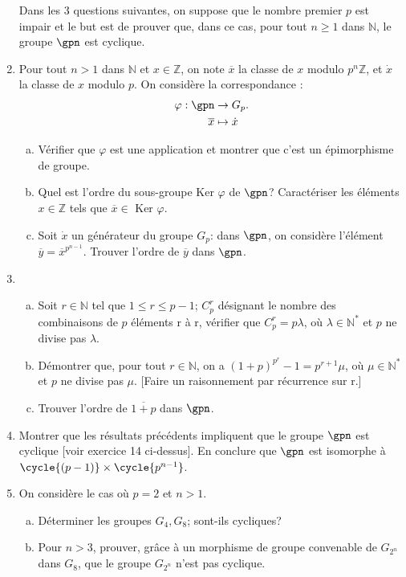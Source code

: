 \begin{enumerate}
   Dans les 3 questions suivantes, on suppose que le nombre premier $p$ est impair et le but est de prouver que, dans ce cas, pour tout $n\geq 1$ dans $\mathbb{N}$, le groupe $\gpn$ est cyclique.
   \item Pour tout $n>1$ dans $\mathbb{N}$ et $x\in \mathbb{Z}$, on note $\overline{x}$ la classe de $x$ modulo $p^n \mathbb{Z}$, et $\Dot{x}$ la classe de $x$ modulo $p$. On considère la correspondance :
   \begin{align*}
\varphi :  \gpn &\rightarrow G_p. \\
 \overline{x} &\mapsto \Dot{x}
\end{align*}
\begin{enumerate}[a)]
    \item Vérifier que $\varphi$ est une application et montrer que c'est un épimorphisme de groupe.
    \item Quel est l'ordre du sous-groupe Ker $\varphi$ de $\gpn$? Caractériser les éléments $x \in \mathbb{Z}$ tels que $\overline{x} \in \text{ Ker } \varphi$.
    \item Soit $\Dot{x}$ un générateur du groupe $G_p$: dans $\gpn$, on considère l'élément $\overline{y}=\overline{x}^{p^{n-1}}$. Trouver l'ordre de $\overline{y}$ dans $\gpn$.
\end{enumerate}
    \item \begin{enumerate}[a)]
        \item Soit $r\in \mathbb{N}$ tel que $1 \leq r \leq p-1$; $C^r_p$ désignant le nombre des combinaisons de $p$ éléments r à r, vérifier que  $C^r_p = p\lambda$, où $\lambda\in\mathbb{N}^*$ et $p$ ne divise pas $\lambda$.
        \item Démontrer que, pour tout $r \in \mathbb{N}$, on a $(1+p)^{p^r}-1=p^{r+1}\mu$, où $\mu \in \mathbb{N}^*$ et $p$ ne divise pas $\mu$. [Faire un raisonnement par récurrence sur r.]
        \item Trouver l'ordre de $\overline{1+p}$ dans $\gpn$.
    \end{enumerate} 
    \item Montrer que les résultats précédents impliquent que le groupe $\gpn$ est cyclique [voir exercice 14 ci-dessus]. En conclure que $\gpn$ est isomorphe à $\cycle{(p-1)} \times \cycle{p^{n-1}}$.
    \item On considère le cas où $p=2$ et $n>1$.
    \begin{enumerate}[a)]
        \item Déterminer les groupes $G_4,G_8$; sont-ils cycliques?
        \item Pour $n>3$, prouver, grâce à un morphisme de groupe convenable de $G_{2^n}$ dans $G_8$, que le groupe $G_{2^n}$ n'est pas cyclique.
    \end{enumerate}
\end{enumerate}